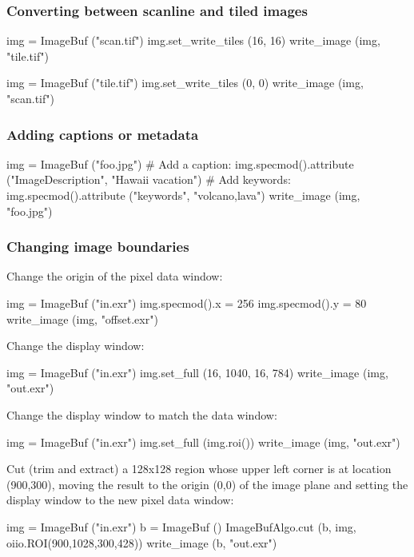 \subsubsection*{Converting between scanline and tiled images}

\begin{code}
    img = ImageBuf ("scan.tif")
    img.set_write_tiles (16, 16)
    write_image (img, "tile.tif")

    img = ImageBuf ("tile.tif")
    img.set_write_tiles (0, 0)
    write_image (img, "scan.tif")
\end{code}


\subsubsection*{Adding captions or metadata}

\begin{code}
    img = ImageBuf ("foo.jpg")
    # Add a caption:
    img.specmod().attribute ("ImageDescription", "Hawaii vacation")
    # Add keywords:
    img.specmod().attribute ("keywords", "volcano,lava")
    write_image (img, "foo.jpg")
\end{code}


\subsubsection*{Changing image boundaries}

\noindent Change the origin of the pixel data window:
\begin{code}
    img = ImageBuf ("in.exr")
    img.specmod().x = 256
    img.specmod().y = 80
    write_image (img, "offset.exr")
\end{code}

\noindent Change the display window:
\begin{code}
    img = ImageBuf ("in.exr")
    img.set_full (16, 1040, 16, 784)
    write_image (img, "out.exr")
\end{code}

\noindent Change the display window to match the data window:
\begin{code}
    img = ImageBuf ("in.exr")
    img.set_full (img.roi())
    write_image (img, "out.exr")
\end{code}

\noindent Cut (trim and extract) a 128x128 region whose upper left corner
is at location (900,300), moving the result to the origin (0,0) of the image
plane and setting the display window to the new pixel data window:
\begin{code}
    img = ImageBuf ("in.exr")
    b = ImageBuf ()
    ImageBufAlgo.cut (b, img, oiio.ROI(900,1028,300,428))
    write_image (b, "out.exr")
\end{code}


